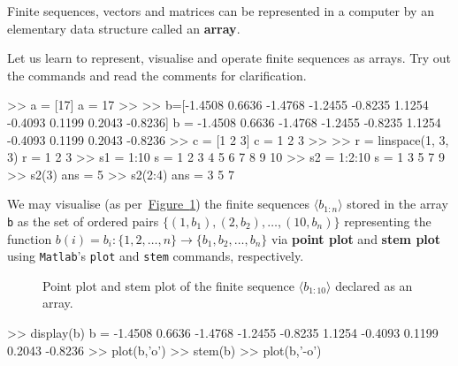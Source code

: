 Finite sequences, vectors and matrices can be represented in a computer by an elementary data structure called an {\bf array}.  

\begin{labwork}\label{LW:Seqs}
Let us learn to represent, visualise and operate finite sequences as \Matlab arrays.  Try out the commands and read the comments for clarification.
\begin{VrbM}
>> a = [17]			%
a =    17
>> %
>> b=[-1.4508 0.6636 -1.4768 -1.2455 -0.8235 1.1254 -0.4093 0.1199 0.2043 -0.8236]
b =
   -1.4508    0.6636   -1.4768   -1.2455   -0.8235    1.1254   -0.4093    0.1199    0.2043   -0.8236
>> c = [1 2 3] 		%
c =     1     2     3
>> %
>> r = linspace(1, 3, 3)		%
r =     1     2     3
>> s1 = 1:10 %
s =     1     2     3     4     5     6     7     8     9    10
>> s2 = 1:2:10  %
s =     1     3     5     7     9
>> s2(3) %
ans =     5
>> s2(2:4) %
ans =     3     5     7
\end{VrbM}
We may visualise (as per~\hyperref[F:StemPlotDemo1]{Figure~\ref*{F:StemPlotDemo1}}) the finite sequences $\langle b_{1:n} \rangle$ stored in the array {\tt b} as the set of ordered pairs $\{(1,b_1),(2,b_2),\ldots,(10,b_{n})\}$ representing the function $b(i)=b_i:\{1,2,\ldots,n\} \to \{b_1,b_2,\ldots,b_{n} \}$ via {\bf point plot} and {\bf stem plot}  using {\tt Matlab}'s {\tt plot} and {\tt stem} commands, respectively.

\begin{figure}[hbt]
\caption{Point plot and stem plot of the finite sequence $\langle b_{1:10} \rangle$ declared as an array.\label{F:StemPlotDemo1}}
\centering   {}
\end{figure}
\begin{VrbM}
>> display(b) %
b =
   -1.4508    0.6636   -1.4768   -1.2455   -0.8235    1.1254   -0.4093    0.1199    0.2043   -0.8236
>> plot(b,'o') %
>> stem(b) %
>> plot(b,'-o') %
\end{VrbM}
\end{labwork}

